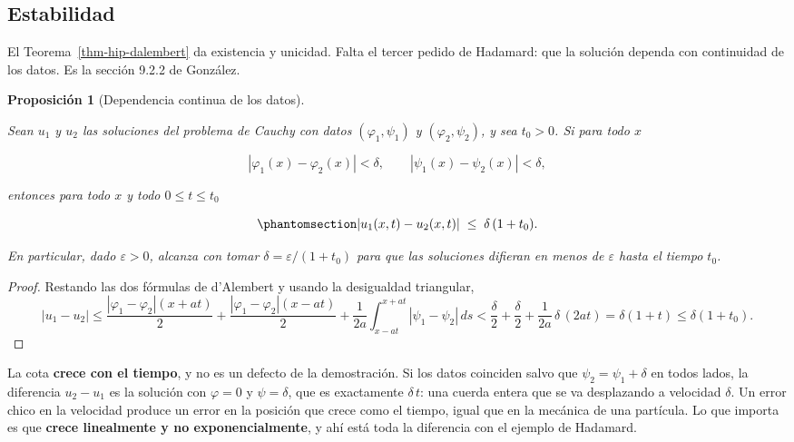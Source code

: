 \documentclass[
  spanish,
  a4paper,
]{scrbook}
\theoremstyle{definition}
\theoremstyle{plain}
\newtheorem{proposition}{Proposición}[chapter]
\theoremstyle{definition}
\theoremstyle{plain}
\theoremstyle{definition}
\theoremstyle{remark}
\begin{document}
\subsection{Estabilidad}\label{sec-hip-estabilidad}

El Teorema~\ref{thm-hip-dalembert} da existencia y unicidad. Falta el
tercer pedido de Hadamard: que la solución dependa con continuidad de
los datos. Es la sección 9.2.2 de González.

\begin{proposition}[Dependencia continua de los
datos]\protect\hypertarget{prp-hip-estabilidad}{}\label{prp-hip-estabilidad}

Sean \(u_1\) y \(u_2\) las soluciones del problema de Cauchy con datos
\((\varphi_1,\psi_1)\) y \((\varphi_2,\psi_2)\), y sea \(t_0>0\). Si
para todo \(x\)

\[
|\varphi_1(x)-\varphi_2(x)| < \delta, \qquad |\psi_1(x)-\psi_2(x)| < \delta,
\]

entonces para todo \(x\) y todo \(0\le t\le t_0\)

\begin{equation}\protect\phantomsection\label{eq-hip-estabilidad}{
|u_1(x,t) - u_2(x,t)| \;\le\; \delta\,(1+t_0) .
}\end{equation}

En particular, dado \(\varepsilon>0\), alcanza con tomar
\(\delta = \varepsilon/(1+t_0)\) para que las soluciones difieran en
menos de \(\varepsilon\) hasta el tiempo \(t_0\).

\end{proposition}

\begin{proof}
Restando las dos fórmulas de d'Alembert y usando la desigualdad
triangular, \[
|u_1-u_2| \le \frac{|\varphi_1-\varphi_2|(x+at)}{2} + \frac{|\varphi_1-\varphi_2|(x-at)}{2}
+ \frac{1}{2a}\int_{x-at}^{x+at}|\psi_1-\psi_2|\,ds
< \frac\delta2 + \frac\delta2 + \frac{1}{2a}\,\delta\,(2at) = \delta(1+t) \le \delta(1+t_0).
\]
\end{proof}

La cota \textbf{crece con el tiempo}, y no es un defecto de la
demostración. Si los datos coinciden salvo que
\(\psi_2 = \psi_1 + \delta\) en todos lados, la diferencia \(u_2 - u_1\)
es la solución con \(\varphi = 0\) y \(\psi = \delta\), que es
exactamente \(\delta\,t\): una cuerda entera que se va desplazando a
velocidad \(\delta\). Un error chico en la velocidad produce un error en
la posición que crece como el tiempo, igual que en la mecánica de una
partícula. Lo que importa es que \textbf{crece linealmente y no
exponencialmente}, y ahí está toda la diferencia con el ejemplo de
Hadamard.
\end{document}
